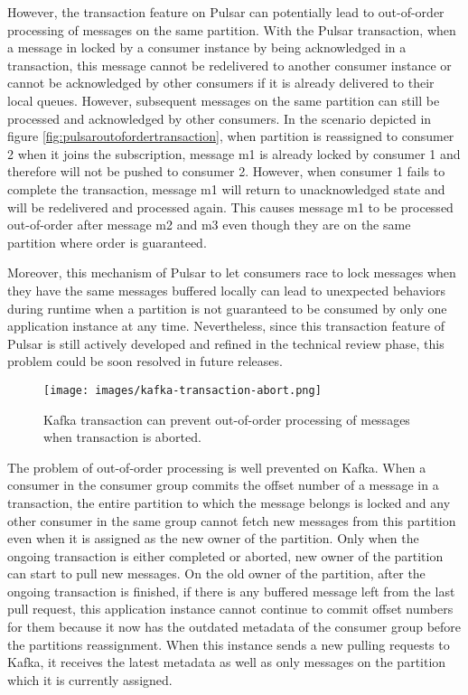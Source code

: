 However, the transaction feature on Pulsar can potentially lead to out-of-order processing of messages on the same partition. With the Pulsar transaction, when a message in locked by a consumer instance by being acknowledged in a transaction, this message cannot be redelivered to another consumer instance or cannot be acknowledged by other consumers if it is already delivered to their local queues. However, subsequent messages on the same partition can still be processed and acknowledged by other consumers. In the scenario depicted in figure \ref{fig:pulsaroutofordertransaction}, when partition is reassigned to consumer 2 when it joins the subscription, message m1 is already locked by consumer 1 and therefore will not be pushed to consumer 2. However, when consumer 1 fails to complete the transaction, message m1 will return to unacknowledged state and will be redelivered and processed again. This causes message m1 to be processed out-of-order after message m2 and m3 even though they are on the same partition where order is guaranteed.

Moreover, this mechanism of Pulsar to let consumers race to lock messages when they have the same messages buffered locally can lead to unexpected behaviors during runtime when a partition is not guaranteed to be consumed by only one application instance at any time. Nevertheless, since this transaction feature of Pulsar is still actively developed and refined in the technical review phase, this problem could be soon resolved in future releases. 

\begin{figure}[h]
	\centering
	\texttt{[image: images/kafka-transaction-abort.png]}
	\caption{Kafka transaction can prevent out-of-order processing of messages when transaction is aborted.}
	\label{fig:kafkatransactionabort}
\end{figure}
The problem of out-of-order processing is well prevented on Kafka. When a consumer in the consumer group commits the offset number of a message in a transaction, the entire partition to which the message belongs is locked and any other consumer in the same group cannot fetch new messages from this partition even when it is assigned as the new owner of the partition. Only when the ongoing transaction is either completed or aborted, new owner of the partition can start to pull new messages. On the old owner of the partition, after the ongoing transaction is finished, if there is any buffered message left from the last pull request, this application instance cannot continue to commit offset numbers for them because it now has the outdated metadata of the consumer group before the partitions reassignment. When this instance sends a new pulling requests to Kafka, it receives the latest metadata as well as only messages on the partition which it is currently assigned.

